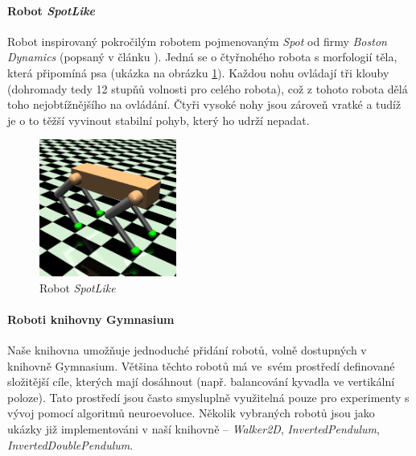 \paragraph{Robot \emph{SpotLike}} \label{imp:robots.Spot}
Robot inspirovaný pokročilým robotem pojmenovaným \emph{Spot} od firmy
\emph{Boston Dynamics} (popsaný v článku \citep{guizzo2019leaps}). Jedná se o
čtyřnohého robota s morfologií těla, která připomíná psa (ukázka na obrázku
\ref{imp:fig:robots.SpotLike}). Každou nohu ovládají tři klouby (dohromady tedy
12 stupňů volnosti pro celého robota), což z tohoto robota dělá toho
nejobtížnějšího na ovládání. Čtyři vysoké nohy jsou zároveň vratké a tudíž je o
to těžší vyvinout stabilní pohyb, který ho udrží nepadat.

\begin{figure}[!htb]
    \centering
    \includegraphics[width=0.4\textwidth]{../img/crop_SpotLike.jpg}
    \caption{Robot \emph{SpotLike}}
    \label{imp:fig:robots.SpotLike}
\end{figure}

\paragraph{}

\paragraph{Roboti knihovny Gymnasium}
Naše knihovna umožňuje jednoduché přidání robotů, volně dostupných v knihovně
Gymnasium. Většina těchto robotů má ve~svém prostředí definované složitější
cíle, kterých mají dosáhnout (např. balancování kyvadla ve vertikální poloze).
Tato prostředí jsou často smysluplně využitelná pouze pro experimenty s vývoj
pomocí algoritmů neuroevoluce. Několik vybraných robotů jsou jako ukázky již
implementováni v naší knihovně -- \emph{Walker2D}, \emph{InvertedPendulum},
\emph{InvertedDoublePendulum}.

